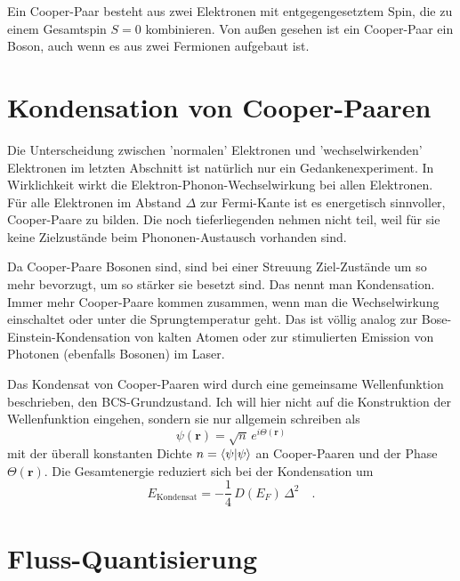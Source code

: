 Ein Cooper-Paar besteht aus zwei Elektronen mit entgegengesetztem Spin, die zu einem Gesamtspin $S=0$ kombinieren. Von außen gesehen ist ein Cooper-Paar ein Boson, auch wenn es aus zwei Fermionen aufgebaut ist.


\section*{Kondensation von Cooper-Paaren}

Die Unterscheidung zwischen 'normalen' Elektronen und 'wechselwirkenden' Elektronen im letzten Abschnitt ist natürlich nur ein Gedankenexperiment. In Wirklichkeit wirkt die Elektron-Phonon-Wechselwirkung bei allen Elektronen. Für alle Elektronen im Abstand $\Delta$ zur Fermi-Kante ist es energetisch sinnvoller, Cooper-Paare zu bilden. Die noch tieferliegenden nehmen nicht teil, weil für sie keine Zielzustände beim Phononen-Austausch vorhanden sind. 

Da Cooper-Paare Bosonen sind, sind bei einer Streuung Ziel-Zustände um so mehr bevorzugt, um so stärker sie besetzt sind. Das nennt man Kondensation. Immer mehr Cooper-Paare kommen zusammen, wenn man die Wechselwirkung einschaltet oder unter die Sprungtemperatur geht. Das ist völlig analog zur Bose-Einstein-Kondensation von kalten Atomen oder zur stimulierten Emission von Photonen (ebenfalls Bosonen) im Laser.

Das Kondensat von Cooper-Paaren wird durch eine gemeinsame Wellenfunktion beschrieben, den BCS-Grundzustand. Ich will hier nicht auf die Konstruktion der Wellenfunktion eingehen, sondern sie nur allgemein schreiben als
\begin{equation}
    \psi(\bm{r}) = \sqrt{n} \, e^{i \Theta(\bm{r})}
\end{equation}
mit der überall konstanten Dichte $n = \braket{\psi | \psi}$ an Cooper-Paaren und der Phase $\Theta(\bm{r})$. Die  Gesamtenergie reduziert sich bei der Kondensation um
\begin{equation}
    E_\text{Kondensat} = - \frac{1}{4} \, D(E_F) \, \Delta^2 \quad . \label{eq:6_E_kondensation}
\end{equation}


\section*{Fluss-Quantisierung}

